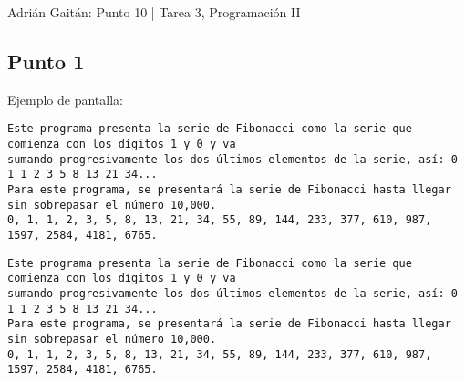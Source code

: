 %
%


Adrián Gaitán: Punto 10 | Tarea 3, Programación II

\subsection{Punto 1}
	
	Ejemplo de pantalla:
\begin{lstlisting}
Este programa presenta la serie de Fibonacci como la serie que comienza con los dígitos 1 y 0 y va
sumando progresivamente los dos últimos elementos de la serie, así: 0 1 1 2 3 5 8 13 21 34...
Para este programa, se presentará la serie de Fibonacci hasta llegar sin sobrepasar el número 10,000.
0, 1, 1, 2, 3, 5, 8, 13, 21, 34, 55, 89, 144, 233, 377, 610, 987, 1597, 2584, 4181, 6765.
\end{lstlisting}

\begin{lstlisting}
Este programa presenta la serie de Fibonacci como la serie que comienza con los dígitos 1 y 0 y va
sumando progresivamente los dos últimos elementos de la serie, así: 0 1 1 2 3 5 8 13 21 34...
Para este programa, se presentará la serie de Fibonacci hasta llegar sin sobrepasar el número 10,000.
0, 1, 1, 2, 3, 5, 8, 13, 21, 34, 55, 89, 144, 233, 377, 610, 987, 1597, 2584, 4181, 6765.
\end{lstlisting}

